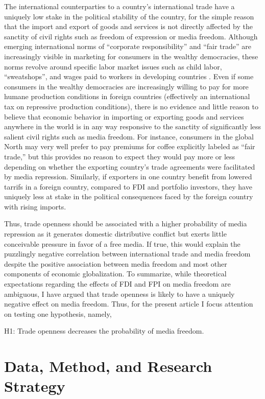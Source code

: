 \documentclass[12pt,a4paper]{article}
\begin{document}
The international counterparties to a country's international trade have a uniquely low stake in the political stability of the country, for the simple reason that the import and export of goods and services is not directly affected by the sanctity of civil rights such as freedom of expression or media freedom. Although emerging international norms of “corporate responsibility” and “fair trade” are increasingly visible in marketing for consumers in the wealthy democracies, these norms revolve around specific labor market issues such as child labor, ``sweatshops'', and wages paid to workers in developing countries \parencite{Moore:2004gy}. Even if some consumers in the wealthy democracies are increasingly willing to pay for more humane production conditions in foreign countries (effectively an international tax on repressive production conditions), there is no evidence and little reason to believe that economic behavior in importing or exporting goods and services anywhere in the world is in any way responsive to the sanctity of significantly less salient civil rights such as media freedom. For instance, consumers in the global North may very well prefer to pay premiums for coffee explicitly labeled as “fair trade,” but this provides no reason to expect they would pay more or less depending on whether the exporting country's trade agreements were facilitated by media repression. Similarly, if exporters in one country benefit from lowered tarrifs in a foreign country, compared to FDI and portfolio investors, they have uniquely less at stake in the political consequences faced by the foreign country with rising imports.

Thus, trade openness should be associated with a higher probability of media repression as it generates domestic distributive conflict but exerts little conceivable pressure in favor of a free media. If true, this would explain the puzzlingly negative correlation between international trade and media freedom despite the positive association between media freedom and most other components of economic globalization.
To summarize, while theoretical expectations regarding the effects of FDI and FPI on media freedom are ambiguous, I have argued that trade openness is likely to have a uniquely negative effect on media freedom. Thus, for the present article I focus attention on testing one hypothesis, namely,

H1: Trade openness decreases the probability of media freedom.


\section{Data, Method, and Research Strategy}
\end{document}
